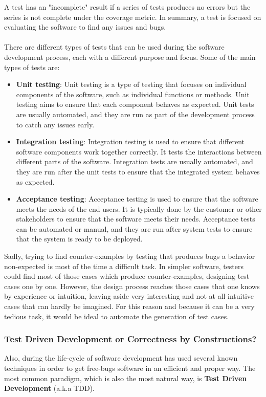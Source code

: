 \documentclass{report}
\theoremstyle{definition}
\theoremstyle{definition}
\begin{document}
A test has an "incomplete" result if a series of tests produces no errors but the series is not complete under the coverage metric. In summary, a test is focused on evaluating the software to find any issues and bugs.\\\\
There are different types of tests that can be used during the software development process, each with a different purpose and focus. Some of the main types of tests are:
\begin{itemize}
	\item \textbf{Unit testing}: Unit testing is a type of testing that focuses on individual components of the software, such as individual functions or methods. Unit testing aims to ensure that each component behaves as expected. Unit tests are usually automated, and they are run as part of the development process to catch any issues early.
	\item \textbf{Integration testing}: Integration testing is used to ensure that different software components work together correctly. It tests the interactions between different parts of the software. Integration tests are usually automated, and they are run after the unit tests to ensure that the integrated system behaves as expected.
	\item \textbf{Acceptance testing}: Acceptance testing is used to ensure that the software meets the needs of the end users. It is typically done by the customer or other stakeholders to ensure that the software meets their needs. Acceptance tests can be automated or manual, and they are run after system tests to ensure that the system is ready to be deployed.
\end{itemize}
Sadly, trying to find counter-examples by testing that produces bugs a behavior non-expected is most of the time a difficult task. In simpler software, testers could find most of those cases which produce counter-examples, designing test cases one by one. However, the design process reaches those cases that one knows by experience or intuition, leaving aside very interesting and not at all intuitive cases that can hardly be imagined. For this reason and because it can be a very tedious task, it would be ideal to automate the generation of test cases.

\subsubsection*{Test Driven Development or Correctness by Constructions?}
Also, during the life-cycle of software development has used several known techniques in order to get free-bugs software in an efficient and proper way. The most common paradigm, which is also the most natural way, is \textbf{Test Driven Development} (a.k.a TDD).\\
\end{document}
